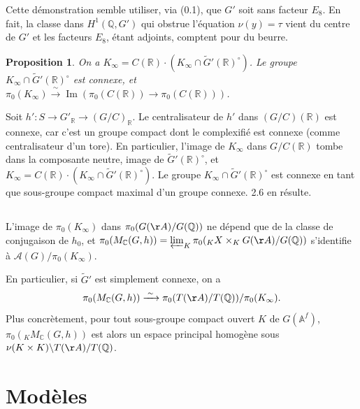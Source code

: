\documentclass[11pt]{amsart}
\theoremstyle{plain}
\newtheorem{proposition}[theorem]{Proposition}
\theoremstyle{definition}
\DeclareMathOperator{\Ima}{Im}
\newcommand{\QQ}{\mathbb{Q}}
\newcommand{\RR}{\mathbb{R}}
\newcommand{\AAf}{\mathbb{A}^f}
\newcommand{\MC}{M_{\mathbb{C}}}
\begin{document}
Cette d\'emonstration semble utiliser, via (0.1), que $G'$ soit sans facteur $E_8$. En fait, la classe dans $H^1(\QQ, G')$ qui obstrue l'\'equation $\nu(y) = \tau$ vient du centre de $G'$ et les facteurs $E_8$, \'etant adjoints, comptent pour du beurre.

\begin{proposition}
On a $K_\infty = C(\RR) \cdot (K_\infty \cap \tilde{G}'(\RR)^\circ)$. Le groupe $K_\infty \cap \tilde{G}'(\RR)^\circ$ est connexe, et $\pi_0(K_\infty) \xrightarrow{\;\sim\;} \Ima(\pi_0(C(\RR)) \longrightarrow \pi_0(C(\RR)))$.
\end{proposition}

Soit $h' : S \to G'_{\RR} \to (G/C)_{\RR}$. Le centralisateur de $h'$ dans $(G/C)(\RR)$ est connexe, car c'est un groupe compact dont le complexifi\'e est connexe (comme centralisateur d'un tore). En particulier, l'image de $K_\infty$ dans $G/C(\RR)$ tombe dans la composante neutre, image de $\tilde{G}'(\RR)^\circ$, et $K_\infty = C(\RR) \cdot (K_\infty \cap \tilde{G}'(\RR)^\circ)$. Le groupe $K_\infty \cap \tilde{G}'(\RR)^\circ$ est connexe en tant que sous-groupe compact maximal d'un groupe connexe. 2.6 en r\'esulte.

\subsection{}

L'image de $\pi_0(K_\infty)$ dans $\pi_0(G(\AA)/G(\QQ))$ ne d\'epend que de la classe de conjugaison de $h_0$, et $\pi_0(\MC(G,h)) = \varprojlim_K \pi_0({}_K X \times_K G(\AA)/G(\QQ))$ s'identifie \`a $\mathcal{A}(G)/\pi_0(K_\infty)$.

En particulier, si $\tilde{G}'$ est simplement connexe, on a
\begin{equation}\label{eq:2.7.1}
\pi_0(\MC(G,h)) \xrightarrow{\;\sim\;} \pi_0(T(\AA)/T(\QQ))/\pi_0(K_\infty).
\end{equation}
Plus concr\`etement, pour tout sous-groupe compact ouvert $K$ de $G(\AAf)$, $\pi_0({}_K \MC(G,h))$ est alors un espace principal homog\`ene sous $\nu(K \times K) \backslash T(\AA)/T(\QQ)$.

\section{Mod\`eles}

\subsection{}
\end{document}
